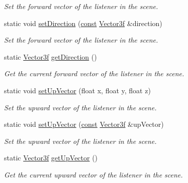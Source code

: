 \begin{DoxyCompactItemize}
\begin{DoxyCompactList}\small\item\em Set the forward vector of the listener in the scene. \end{DoxyCompactList}\item 
static void \hyperlink{classsf_1_1_listener_a1d99d9457c6ddad93449ecb4f504c2bf}{set\-Direction} (\hyperlink{term__entry_8h_a57bd63ce7f9a353488880e3de6692d5a}{const} \hyperlink{namespacesf_a36e44d9e6d8f649703698ec9d24ac052}{Vector3f} \&direction)
\begin{DoxyCompactList}\small\item\em Set the forward vector of the listener in the scene. \end{DoxyCompactList}\item 
static \hyperlink{namespacesf_a36e44d9e6d8f649703698ec9d24ac052}{Vector3f} \hyperlink{classsf_1_1_listener_a54e91baba51d4431474f53ff7f9309f9}{get\-Direction} ()
\begin{DoxyCompactList}\small\item\em Get the current forward vector of the listener in the scene. \end{DoxyCompactList}\item 
static void \hyperlink{classsf_1_1_listener_a0ea9b3083a994b2b90253543bc4e3ad6}{set\-Up\-Vector} (float x, float y, float z)
\begin{DoxyCompactList}\small\item\em Set the upward vector of the listener in the scene. \end{DoxyCompactList}\item 
static void \hyperlink{classsf_1_1_listener_a281e8cd44d3411d891b5e83b0cb6b9d4}{set\-Up\-Vector} (\hyperlink{term__entry_8h_a57bd63ce7f9a353488880e3de6692d5a}{const} \hyperlink{namespacesf_a36e44d9e6d8f649703698ec9d24ac052}{Vector3f} \&up\-Vector)
\begin{DoxyCompactList}\small\item\em Set the upward vector of the listener in the scene. \end{DoxyCompactList}\item 
static \hyperlink{namespacesf_a36e44d9e6d8f649703698ec9d24ac052}{Vector3f} \hyperlink{classsf_1_1_listener_ae1427dd7e9b425b0c23b7b766bd6c6e6}{get\-Up\-Vector} ()
\begin{DoxyCompactList}\small\item\em Get the current upward vector of the listener in the scene. \end{DoxyCompactList}\end{DoxyCompactItemize}


